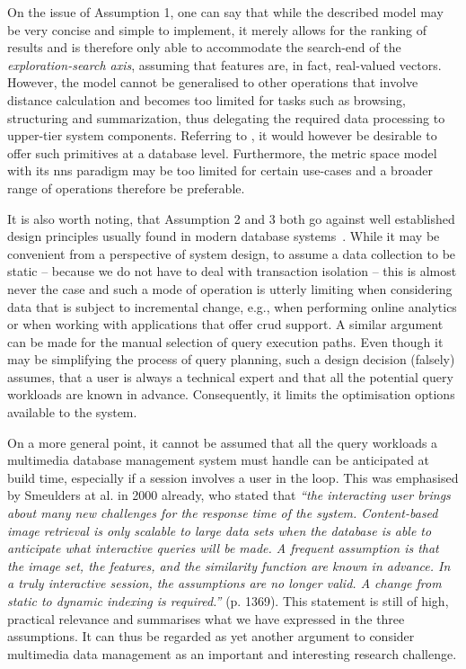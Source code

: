 On the issue of Assumption 1, one can say that while the described model may be very concise and simple to implement, it merely allows for the ranking of results and is therefore only able to accommodate the search-end of the \emph{exploration-search axis}, assuming that features are, in fact, real-valued vectors. However, the model cannot be generalised to other operations that involve distance calculation and becomes too limited for tasks such as browsing, structuring and summarization, thus delegating the required data processing to upper-tier system components. Referring to \cite{Jonsson:2016Ten}, it would however be desirable to offer such primitives at a database level. Furthermore, the metric space model with its \acrfull{nns} paradigm may be too limited for certain use-cases and a broader range of operations therefore be preferable.

It is also worth noting, that Assumption 2 and 3 both go against well established design principles usually found in modern database systems~\cite{Petrov:2019Database,Amsaleg:2014Database}. While it may be convenient from a perspective of system design, to assume a data collection to be static -- because we do not have to deal with transaction isolation -- this is almost never the case and such a mode of operation is utterly limiting when considering data that is subject to incremental change, e.g., when performing online analytics or when working with applications that offer \acrshort{crud} support. A similar argument can be made for the manual selection of query execution paths. Even though it may be simplifying the process of query planning, such a design decision (falsely) assumes, that a user is always a technical expert and that all the potential query workloads are known in advance. Consequently, it limits the optimisation options available to the system. 

On a more general point, it cannot be assumed that all the query workloads a multimedia database management system must handle can be anticipated at build time, especially if a session involves a user in the loop. This was emphasised by Smeulders at al. in 2000 already, who stated that \emph{``the interacting user brings about many new challenges for the response time of the system. Content-based image retrieval is only scalable to large data sets when the database is able to anticipate what interactive queries will be made. A frequent assumption is that the image set, the features, and the similarity function are known in advance. In a truly interactive session, the assumptions are no longer valid. A change from static to dynamic indexing is required.''} \cite{Smeulders:2000Content} (p. 1369). This statement is still of high, practical relevance and summarises what we have expressed in the three assumptions. It can thus be regarded as yet another argument to consider multimedia data management as an important and interesting research challenge.

